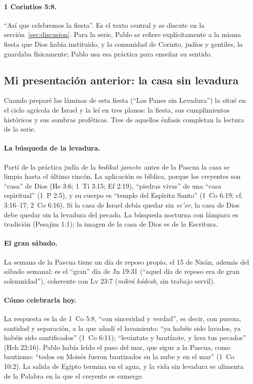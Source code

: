 \documentclass[11pt,letterpaper]{article}
\begin{document}
\paragraph{1 Corintios 5:8.} ``Así que celebremos la fiesta''. Es el texto central y se discute en la sección~\ref{sec:discusion}. Para la serie, Pablo se refiere explícitamente a la misma fiesta que Dios había instituido, y la comunidad de Corinto, judíos y gentiles, la guardaba físicamente; Pablo usa esa práctica para enseñar su sentido.

\subsection{Mi presentación anterior: la casa sin levadura}
Cuando preparé las láminas de esta fiesta (``Los Panes sin Levadura'') la situé en el ciclo agrícola de Israel y la leí en tres planos: la fiesta, sus cumplimientos históricos y sus sombras proféticas. Tres de aquellos énfasis completan la lectura de la serie.

\paragraph{La búsqueda de la levadura.} Partí de la práctica judía de la \emph{bedikat jamets}: antes de la Pascua la casa se limpia hasta el último rincón. La aplicación es bíblica, porque los creyentes son ``casa'' de Dios (He 3:6; 1~Ti 3:15; Ef 2:19), ``piedras vivas'' de una ``casa espiritual'' (1~P 2:5), y su cuerpo es ``templo del Espíritu Santo'' (1~Co 6:19; cf. 3:16--17; 2~Co 6:16). Si la casa de Israel debía quedar sin \emph{se'or}, la casa de Dios debe quedar sin la levadura del pecado. La búsqueda nocturna con lámpara es tradición (Pesajim 1:1); la imagen de la casa de Dios es de la Escritura.

\paragraph{El gran sábado.} La semana de la Pascua tiene un día de reposo propio, el 15 de Nisán, además del sábado semanal: es el ``gran'' día de Jn 19:31 (``aquel día de reposo era de gran solemnidad''), coherente con Lv 23:7 (\emph{mikrá kódesh}, sin trabajo servil).

\paragraph{Cómo celebrarla hoy.} La respuesta es la de 1~Co 5:8, ``con sinceridad y verdad'', es decir, con pureza, santidad y separación, a la que añadí el lavamiento: ``ya habéis sido lavados, ya habéis sido santificados'' (1~Co 6:11); ``levántate y bautízate, y lava tus pecados'' (Hch 22:16). Pablo había leído el paso del mar, que sigue a la Pascua, como bautismo: ``todos en Moisés fueron bautizados en la nube y en el mar'' (1~Co 10:2). La salida de Egipto termina en el agua, y la vida sin levadura se alimenta de la Palabra en la que el creyente se sumerge.
\end{document}
